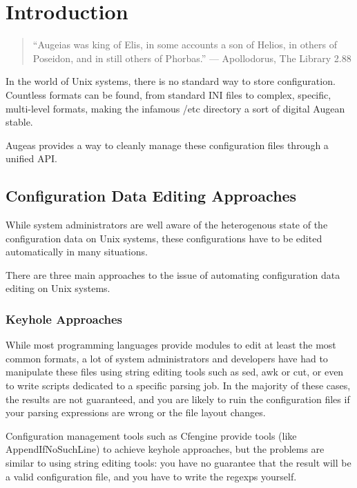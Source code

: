 \chapter*{Introduction}

\begin{quote}
``Augeias was king of Elis, in some accounts a son of Helios, in others of Poseidon, and in still others of Phorbas.'' --- Apollodorus, The Library 2.88
\end{quote}

In the world of Unix systems, there is no standard way to store configuration. Countless formats can be found, from standard INI files to complex, specific, multi-level formats, making the infamous /etc directory a sort of digital Augean stable.

Augeas provides a way to cleanly manage these configuration files through a unified API.

\section*{Configuration Data Editing Approaches}

While system administrators are well aware of the heterogenous state of the configuration data on Unix systems, these configurations have to be edited automatically in many situations.

There are three main approaches to the issue of automating configuration data editing on Unix systems.

\subsection*{Keyhole Approaches}

While most programming languages provide modules to edit at least the most common formats, a lot of system administrators and developers have had to manipulate these files using string editing tools such as sed, awk or cut, or even to write scripts dedicated to a specific parsing job. In the majority of these cases, the results are not guaranteed, and you are likely to ruin the configuration files if your parsing expressions are wrong or the file layout changes.

Configuration management tools such as Cfengine provide tools (like AppendIfNoSuchLine) to achieve keyhole approaches, but the problems are similar to using string editing tools: you have no guarantee that the result will be a valid configuration file, and you have to write the regexps yourself.

